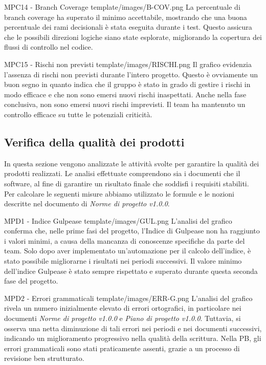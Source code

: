 \MetNoPB
{ %
    MPC14 - Branch Coverage
}
{ %
    template/images/B-COV.png
}
{ %
    La percentuale di branch coverage ha superato il minimo accettabile, mostrando che una buona percentuale dei rami decisionali è stata eseguita durante i test. Questo assicura che le possibili direzioni logiche siano state esplorate, migliorando la copertura dei flussi di controllo nel codice.
}



\Met
{ %
    MPC15 - Rischi non previsti
}
{ %
    template/images/RISCHI.png
}
{ %
    Il grafico evidenzia l'assenza di rischi non previsti durante l'intero progetto.
    Questo è ovviamente un buon segno in quanto indica che il gruppo è stato in grado 
    di gestire i rischi in modo efficace e che non sono emersi nuovi rischi inaspettati.
}
{ %
    Anche nella fase conclusiva, non sono emersi nuovi rischi imprevisti. Il team ha mantenuto un controllo efficace su tutte le potenziali criticità.
}

\subsection{Verifica della qualità dei prodotti}
In questa sezione vengono analizzate le attività svolte per garantire la qualità dei prodotti realizzati.
Le analisi effettuate comprendono sia i documenti che il software, al fine di garantire un risultato finale che soddisfi i requisiti stabiliti.\\
Per calcolare le seguenti misure abbiamo utilizzato le formule e le nozioni descritte nel documento di \textit{Norme di progetto v1.0.0}.

\Met
{ %
    MPD1 - Indice Gulpease
}
{ %
    template/images/GUL.png
}
{ %
    L'analisi del grafico conferma che, nelle prime fasi del progetto, l'Indice di Gulpease non ha raggiunto i 
    valori minimi, a causa della mancanza di conoscenze specifiche da parte del team.
    Solo dopo aver implementato un'automazione per il calcolo dell'indice, è stato possibile 
    migliorarne i risultati nei periodi successivi.
}
{ %
    Il valore minimo dell'indice Gulpease è stato sempre rispettato e superato durante questa seconda fase del progetto.
}

\Met
{ %
    MPD2 - Errori grammaticali
}
{ %
    template/images/ERR-G.png
}
{ %
    L'analisi del grafico rivela un numero inizialmente elevato di errori ortografici, 
    in particolare nei documenti \textit{Norme di progetto v1.0.0} e \textit{Piano di progetto v1.0.0}.
    Tuttavia, si osserva una netta diminuzione di tali errori nei periodi e nei 
    documenti successivi, indicando un miglioramento progressivo nella qualità della scrittura.
}
{ %
    Nella PB, gli errori grammaticali sono stati praticamente assenti, grazie a un processo di revisione ben strutturato.
}

